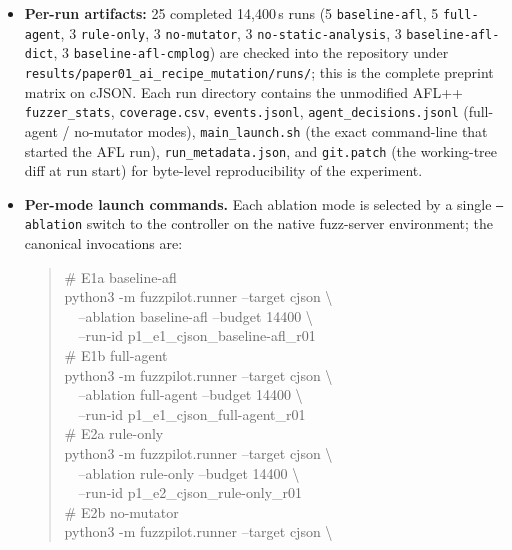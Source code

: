 \documentclass[11pt]{article}
\begin{document}
\begin{itemize}
  deprecated for this paper because the reported campaigns depend on
  the fuzz-server host toolchain, Ghidra installation, AFL++ build,
  CPU scheduling, and run directories captured in the native artifacts.
  \item \textbf{Per-run artifacts:} 25 completed 14{,}400\,s runs
  (5 \texttt{baseline-afl}, 5 \texttt{full-agent},
  3 \texttt{rule-only}, 3 \texttt{no-mutator},
  3 \texttt{no-static-analysis},
  3 \texttt{baseline-afl-dict}, 3 \texttt{baseline-afl-cmplog})
  are checked into the repository under
  \texttt{results/paper01\_ai\_recipe\_mutation/runs/}; this is
  the complete preprint matrix on cJSON.
  Each run directory contains the unmodified AFL++
  \texttt{fuzzer\_stats}, \texttt{coverage.csv},
  \texttt{events.jsonl}, \texttt{agent\_decisions.jsonl}
  (full-agent / no-mutator modes), \texttt{main\_launch.sh}
  (the exact command-line that started the AFL run),
  \texttt{run\_metadata.json}, and \texttt{git.patch}
  (the working-tree diff at run start) for byte-level
  reproducibility of the experiment.
  \item \textbf{Per-mode launch commands.}
  Each ablation mode is selected by a single
  \texttt{--ablation} switch to the controller on the native
  fuzz-server environment; the canonical invocations are:
  \begin{quote}\scriptsize\ttfamily
  \# E1a baseline-afl\\
  python3 -m fuzzpilot.runner --target cjson \textbackslash{}\\
  ~~--ablation baseline-afl --budget 14400 \textbackslash{}\\
  ~~--run-id p1\_e1\_cjson\_baseline-afl\_r01\\[2pt]
  \# E1b full-agent\\
  python3 -m fuzzpilot.runner --target cjson \textbackslash{}\\
  ~~--ablation full-agent --budget 14400 \textbackslash{}\\
  ~~--run-id p1\_e1\_cjson\_full-agent\_r01\\[2pt]
  \# E2a rule-only\\
  python3 -m fuzzpilot.runner --target cjson \textbackslash{}\\
  ~~--ablation rule-only --budget 14400 \textbackslash{}\\
  ~~--run-id p1\_e2\_cjson\_rule-only\_r01\\[2pt]
  \# E2b no-mutator\\
  python3 -m fuzzpilot.runner --target cjson \textbackslash{}\\

\end{quote}
\end{itemize}
\end{document}
